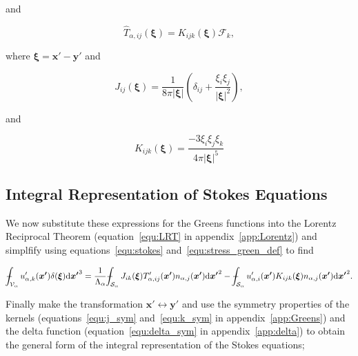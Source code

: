 \documentclass[12pt]{article}
\def\Xint#1{\mathchoice
{\XXint\displaystyle\textstyle{#1}}%
{\XXint\textstyle\scriptstyle{#1}}%
{\XXint\scriptstyle\scriptscriptstyle{#1}}%
{\XXint\scriptscriptstyle\scriptscriptstyle{#1}}%
\!\int}
\def\XXint#1#2#3{{\setbox0=\hbox{$#1{#2#3}{\int}$}
\vcenter{\hbox{$#2#3$}}\kern-.5\wd0}}
\def\dashint{\Xint-}
\begin{document}
and 

\begin{equation}
\label{equ:stress_green}
\hat{T}_{\alpha, ij}(\boldsymbol{\xi}) = K_{ijk}(\boldsymbol{\xi}) \mathcal{F}_{k} ,
\end{equation}

where $\boldsymbol{\xi} = \boldsymbol{x'} - \boldsymbol{y'}$ and 

\begin{equation}
\label{equ:J_kernal}
J_{ij}(\boldsymbol{\xi}) = \frac{1}{8 \pi |\boldsymbol{\xi}|} \left( \delta_{ij} + \frac{\xi_{i} \xi_{j}}{|\boldsymbol{\xi}|^{2}} \right) ,
\end{equation}

and

\begin{equation}
\label{equ:K_kernal}
K_{ijk}(\boldsymbol{\xi}) = \frac{-3 \xi_{i} \xi_{j} \xi_{k}}{4 \pi |\boldsymbol{\xi}|^{5}}
\end{equation}

\subsection{Integral Representation of Stokes Equations}
\label{subsec:int_rep}

We now substitute these expressions for the Greens functions into the Lorentz Reciprocal Theorem (equation~\ref{equ:LRT} in appendix~\ref{app:Lorentz}) and simplfify using equations~\ref{equ:stokes} and~\ref{equ:stress_green_def} to find

\begin{equation}
\label{equ:gen_int_rep}
\dashint_{\mathcal{V}_{\alpha}} u'_{\alpha, k}(\boldsymbol{x'}) \delta(\boldsymbol{\xi}) \mathrm{d} \boldsymbol{x'}^{3} = \frac{1}{\Lambda_{\alpha}} \dashint_{\mathcal{S}_{\alpha}} J_{ik}(\boldsymbol{\xi}) T'_{\alpha,ij}(\boldsymbol{x'}) n_{\alpha,j}(\boldsymbol{x'}) \mathrm{d} \boldsymbol{x'}^{2} - \dashint_{\mathcal{S}_{\alpha}} u'_{\alpha,i}(\boldsymbol{x'}) K_{ijk}(\boldsymbol{\xi}) n_{\alpha,j}(\boldsymbol{x'}) \mathrm{d} \boldsymbol{x'}^{2} .
\end{equation}

Finally make the transformation $\boldsymbol{x'} \leftrightarrow \boldsymbol{y'}$ and use the symmetry properties of the kernels (equations~\ref{equ:j_sym} and~\ref{equ:k_sym} in appendix~\ref{app:Greens}) and the delta function (equation~\ref{equ:delta_sym} in appendix~\ref{app:delta}) to obtain the general form of the integral representation of the Stokes equations;
\end{document}

